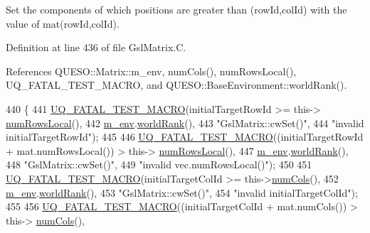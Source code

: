 Set the components of {\ttfamily which} positions are greater than (row\-Id,col\-Id) with the value of mat(row\-Id,col\-Id). 



Definition at line 436 of file Gsl\-Matrix.\-C.



References Q\-U\-E\-S\-O\-::\-Matrix\-::m\-\_\-env, num\-Cols(), num\-Rows\-Local(), U\-Q\-\_\-\-F\-A\-T\-A\-L\-\_\-\-T\-E\-S\-T\-\_\-\-M\-A\-C\-R\-O, and Q\-U\-E\-S\-O\-::\-Base\-Environment\-::world\-Rank().


\begin{DoxyCode}
440 \{
441   \hyperlink{_defines_8h_a56d63d18d0a6d45757de47fcc06f574d}{UQ\_FATAL\_TEST\_MACRO}(initialTargetRowId >= this->
      \hyperlink{class_q_u_e_s_o_1_1_gsl_matrix_ab5ec937a9fd439eef1a87e12c0dbccb4}{numRowsLocal}(),
442                       \hyperlink{class_q_u_e_s_o_1_1_matrix_a247fb0fc0b87fecdee054bb4660b68e8}{m\_env}.\hyperlink{class_q_u_e_s_o_1_1_base_environment_a78b57112bbd0e6dd0e8afec00b40ffa7}{worldRank}(),
443                       \textcolor{stringliteral}{"GslMatrix::cwSet()"},
444                       \textcolor{stringliteral}{"invalid initialTargetRowId"});
445 
446   \hyperlink{_defines_8h_a56d63d18d0a6d45757de47fcc06f574d}{UQ\_FATAL\_TEST\_MACRO}((initialTargetRowId + mat.numRowsLocal()) > this->
      \hyperlink{class_q_u_e_s_o_1_1_gsl_matrix_ab5ec937a9fd439eef1a87e12c0dbccb4}{numRowsLocal}(),
447                       \hyperlink{class_q_u_e_s_o_1_1_matrix_a247fb0fc0b87fecdee054bb4660b68e8}{m\_env}.\hyperlink{class_q_u_e_s_o_1_1_base_environment_a78b57112bbd0e6dd0e8afec00b40ffa7}{worldRank}(),
448                       \textcolor{stringliteral}{"GslMatrix::cwSet()"},
449                       \textcolor{stringliteral}{"invalid vec.numRowsLocal()"});
450 
451   \hyperlink{_defines_8h_a56d63d18d0a6d45757de47fcc06f574d}{UQ\_FATAL\_TEST\_MACRO}(initialTargetColId >= this->\hyperlink{class_q_u_e_s_o_1_1_gsl_matrix_ad5005f168fe030468e834776afb1859b}{numCols}(),
452                       \hyperlink{class_q_u_e_s_o_1_1_matrix_a247fb0fc0b87fecdee054bb4660b68e8}{m\_env}.\hyperlink{class_q_u_e_s_o_1_1_base_environment_a78b57112bbd0e6dd0e8afec00b40ffa7}{worldRank}(),
453                       \textcolor{stringliteral}{"GslMatrix::cwSet()"},
454                       \textcolor{stringliteral}{"invalid initialTargetColId"});
455 
456   \hyperlink{_defines_8h_a56d63d18d0a6d45757de47fcc06f574d}{UQ\_FATAL\_TEST\_MACRO}((initialTargetColId + mat.numCols()) > this->
      \hyperlink{class_q_u_e_s_o_1_1_gsl_matrix_ad5005f168fe030468e834776afb1859b}{numCols}(),

\end{DoxyCode}
